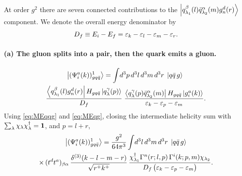 At order $g^{2}$ there are seven connected contributions to the
$\left|q^{\beta}_{\lambda_{1}}(l)\bar q^{\alpha}_{\lambda_{2}}(m)g^{d}_{n}(r)\right\rangle$ component. We denote the
overall energy denominator by
\begin{equation}
D_{f}\equiv E_{i}-E_{f}=\varepsilon_{k}-\varepsilon_{l}-\varepsilon_{m}-\varepsilon_{r} .
\end{equation}

\paragraph{(a) The gluon splits into a pair, then the quark emits a gluon.}
\begin{center}
\end{center}
\begin{multline}
\left|(\Psi^{a}_{i}(k))^{1}_{gq\bar q}\right\rangle=\int\! d^{3}p\,d^{3}l\,d^{3}m\,d^{3}r\;
\left|q\bar q\,g\right\rangle\;
\\
\frac{\left\langle q^{\beta}_{\lambda_{1}}(l)g^{d}_{n}(r)\right|H_{gq\bar q}\left|q^{\gamma}_{\lambda}(p)\right\rangle}{D_{f}}\;
\frac{\left\langle q^{\gamma}_{\lambda}(p)\bar q^{\alpha}_{\lambda_{2}}(m)\right|H_{gq\bar q}\left|g^{a}_{i}(k)\right\rangle}
{\varepsilon_{k}-\varepsilon_{p}-\varepsilon_{m}} .
\end{multline}
Using \eqref{eq:MEqqg} and \eqref{eq:MEqg}, closing the intermediate helicity sum with
$\sum_{\lambda}\chi_{\lambda}\chi^{\dagger}_{\lambda}=\mathbf 1$, and $p=l+r$,
\begin{multline}
\left|(\Psi^{a}_{i}(k))^{1}_{gq\bar q}\right\rangle=\frac{g^{2}}{64\pi^{3}}\int\! d^{3}l\,d^{3}m\,d^{3}r\;
\left|q\bar q\,g\right\rangle\\
\times\,(t^{d}t^{a})_{\beta\alpha}\,\frac{\delta^{(3)}(k-l-m-r)}{\sqrt{r^{+}k^{+}}}\,
\frac{\chi^{\dagger}_{\lambda_{1}}\Gamma^{n}(r;l,p)\,\Gamma^{i}(k;p,m)\chi_{\lambda_{2}}}
{D_{f}\,\big(\varepsilon_{k}-\varepsilon_{p}-\varepsilon_{m}\big)} .
\label{eq:B3a}
\end{multline}

